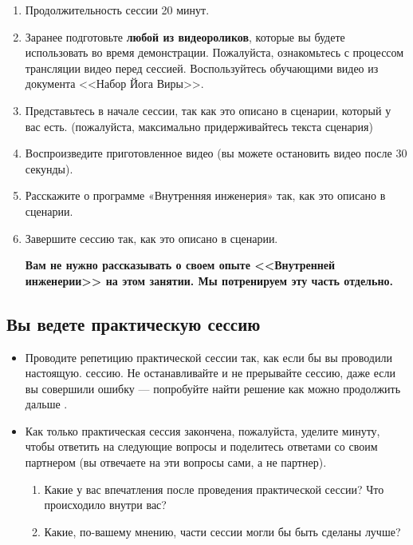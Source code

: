 \documentclass[
a4paper, %
12pt, %
article,
onecolumn, %
openany, %
]{memoir}
\begin{document}
\begin{enumerate}
\item Продолжительность сессии 20 минут.
\item Заранее подготовьте \textbf{любой из видеороликов}, которые вы будете использовать во время демонстрации. Пожалуйста, ознакомьтесь с процессом трансляции видео перед сессией. Воспользуйтесь обучающими видео из документа  <<Набор Йога Виры>>.
\item Представьтесь в начале сессии, так как это описано в сценарии, который у вас есть.
(пожалуйста, максимально придерживайтесь текста сценария)
\item Воспроизведите приготовленное видео  (вы можете остановить видео после 30 секунды).
\item Расскажите о программе «Внутренняя инженерия» так, как это описано в сценарии.
\item Завершите сессию так, как это описано в сценарии.

    \textbf{Вам не нужно рассказывать о своем опыте <<Внутренней инженерии>> на этом занятии. Мы потренируем эту часть отдельно.}
\end{enumerate}


\subsection*{Вы ведете практическую сессию}
\begin{itemize}
\item Проводите репетицию практической сессии так, как если бы вы проводили настоящую.
сессию. Не останавливайте и не прерывайте сессию, даже если вы совершили ошибку —
попробуйте найти решение как можно продолжить дальше \faSmileO.
\item Как только практическая сессия закончена, пожалуйста, уделите минуту, чтобы ответить на следующие вопросы и поделитесь ответами со своим партнером (вы отвечаете на эти вопросы сами, а не партнер).
\begin{enumerate}
\item Какие у вас впечатления после проведения практической сессии? Что происходило
внутри вас?
\item Какие, по-вашему мнению, части сессии могли бы быть сделаны лучше?
\end{enumerate} 
\end{itemize}
\end{document}
